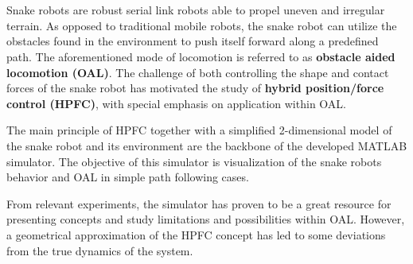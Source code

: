 \chapter{\abstractname}




Snake robots are robust serial link robots able to propel uneven and irregular terrain. As opposed to traditional mobile robots, the snake robot can utilize the obstacles found in the environment to push itself forward along a predefined path. The aforementioned mode of locomotion is referred to as \textbf{obstacle aided locomotion (OAL)}. The challenge of both controlling the shape and contact forces of the snake robot has motivated the study of \textbf{hybrid position/force control (HPFC)}, with special emphasis on application within OAL.




The main principle of HPFC together with a simplified 2-dimensional model of the snake robot and its environment are the backbone of the developed MATLAB simulator. The objective of this simulator is visualization of the snake robots behavior and OAL in simple path following cases.


From relevant experiments, the simulator has proven to be a great resource for presenting concepts and study limitations and possibilities within OAL. However, a geometrical approximation of the HPFC concept has led to some deviations from the true dynamics of the system.


\makeatletter
{}


\makeatother







